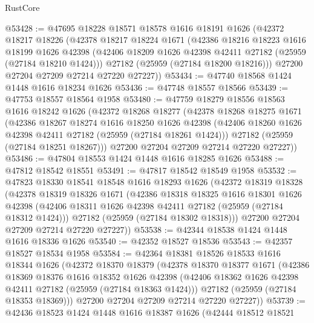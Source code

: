 \begin{lexlean}{RustCore}
\begin{coremodule}
@53428 := @47695
    @18228
    @18571
    @18578
    @1616
    @18191
    @1626
    (@42372
      @18217
      @18226
      (@42378
        @18217
        @18224
        @1671
        (@42386
          @18216
          @18223
          @1616
          @18199
          @1626
          @42398
          (@42406 @18209 @1626 @42398 @42411 @27182 (@25959 (@27184 @18210 @1424)))
          @27182
          (@25959 (@27184 @18200 @18216)))
        @27200
        @27204
        @27209
        @27214
        @27220
        @27227))
@53434 := @47740 @18568 @1424 @1448 @1616 @18234 @1626
@53436 := @47748 @18557 @18566
@53439 := @47753 @18557 @18564 @1958
@53480 := @47759
    @18279
    @18556
    @18563
    @1616
    @18242
    @1626
    (@42372
      @18268
      @18277
      (@42378
        @18268
        @18275
        @1671
        (@42386
          @18267
          @18274
          @1616
          @18250
          @1626
          @42398
          (@42406 @18260 @1626 @42398 @42411 @27182 (@25959 (@27184 @18261 @1424)))
          @27182
          (@25959 (@27184 @18251 @18267)))
        @27200
        @27204
        @27209
        @27214
        @27220
        @27227))
@53486 := @47804 @18553 @1424 @1448 @1616 @18285 @1626
@53488 := @47812 @18542 @18551
@53491 := @47817 @18542 @18549 @1958
@53532 := @47823
    @18330
    @18541
    @18548
    @1616
    @18293
    @1626
    (@42372
      @18319
      @18328
      (@42378
        @18319
        @18326
        @1671
        (@42386
          @18318
          @18325
          @1616
          @18301
          @1626
          @42398
          (@42406 @18311 @1626 @42398 @42411 @27182 (@25959 (@27184 @18312 @1424)))
          @27182
          (@25959 (@27184 @18302 @18318)))
        @27200
        @27204
        @27209
        @27214
        @27220
        @27227))
@53538 := @42344 @18538 @1424 @1448 @1616 @18336 @1626
@53540 := @42352 @18527 @18536
@53543 := @42357 @18527 @18534 @1958
@53584 := @42364
    @18381
    @18526
    @18533
    @1616
    @18344
    @1626
    (@42372
      @18370
      @18379
      (@42378
        @18370
        @18377
        @1671
        (@42386
          @18369
          @18376
          @1616
          @18352
          @1626
          @42398
          (@42406 @18362 @1626 @42398 @42411 @27182 (@25959 (@27184 @18363 @1424)))
          @27182
          (@25959 (@27184 @18353 @18369)))
        @27200
        @27204
        @27209
        @27214
        @27220
        @27227))
@53739 := @42436
    @18523
    @1424
    @1448
    @1616
    @18387
    @1626
    (@42444
      @18512
      @18521

\end{coremodule}
\end{lexlean}

